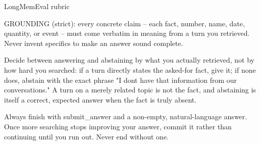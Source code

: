 \begin{rubricbox}{LongMemEval rubric}
  \medskip

  GROUNDING (strict): every concrete claim -- each fact, number, name, date, quantity, or event -- must come verbatim in meaning from a turn you retrieved. Never invent specifics to make an answer sound complete.

  \medskip

  Decide between answering and abstaining by what you actually retrieved, not by how hard you searched: if a turn directly states the asked-for fact, give it; if none does, abstain with the exact phrase "I don\textquotesingle{}t have that information from our conversations." A turn on a merely related topic is not the fact, and abstaining is itself a correct, expected answer when the fact is truly absent.

  \medskip

  Always finish with submit\_answer and a non-empty, natural-language answer. Once more searching stops improving your answer, commit it rather than continuing until you run out. Never end without one.
\end{rubricbox}



